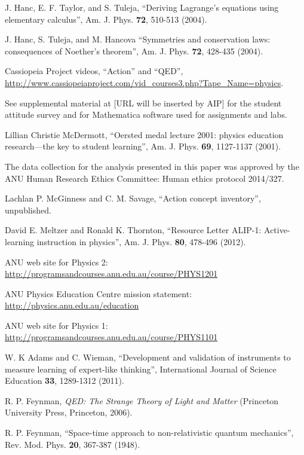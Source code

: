 \documentclass[prb,oncolumn]{revtex4-2}
\begin{document}
\begin{thebibliography}{99}
 J. Hanc, E. F. Taylor, and S. Tuleja, ``Deriving Lagrange's equations using elementary calculus'', Am. J. Phys. \textbf{72}, 510-513 (2004).

 J. Hanc, S. Tuleja, and M. Hancova ``Symmetries and conservation laws: consequences of Noether's theorem'', Am. J. Phys. \textbf{72}, 428-435 (2004).

 Cassiopeia Project videos, ``Action'' and ``QED'',  \url{http://www.cassiopeiaproject.com/vid_courses3.php?Tape_Name=physics}.

 See supplemental material at [URL will be inserted by AIP] for the student attitude survey and for Mathematica software used for assignments and labs.

 Lillian Christie McDermott, ``Oersted medal lecture 2001: physics education research---the key to student learning'', Am. J. Phys. \textbf{69}, 1127-1137 (2001).

 The data collection for the analysis presented in this paper was approved by the ANU Human Research Ethics Committee: Human ethics protocol 2014/327.

 Lachlan P. McGinness and C. M. Savage, ``Action concept inventory'', unpublished.

 David E. Meltzer and Ronald K. Thornton, ``Resource Letter ALIP-1: Active-learning instruction in physics'', Am. J. Phys. \textbf{80}, 478-496 (2012).

 ANU web site for Physics 2: \url{http://programsandcourses.anu.edu.au/course/PHYS1201}

 ANU Physics Education Centre mission statement: \url{http://physics.anu.edu.au/education}

 ANU web site for Physics 1: \url{http://programsandcourses.anu.edu.au/course/PHYS1101}

  W. K Adams and C. Wieman, ``Development and validation of instruments to measure learning of expert-like thinking'', International Journal of Science Education \textbf{33}, 1289-1312 (2011).

 R. P. Feynman, \textit{QED: The Strange Theory of Light and Matter} (Princeton University Press, Princeton, 2006).

 R. P. Feynman, ``Space-time approach to non-relativistic quantum mechanics'', Rev. Mod. Phys. \textbf{20}, 367-387 (1948).


\end{thebibliography}
\end{document}
